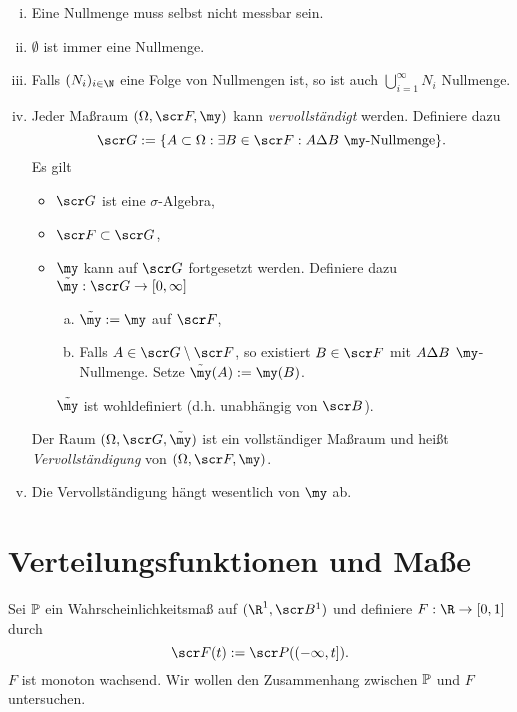 \begin{nt} \label{1.3.13}
	\begin{enumerate}[(i)] %
		\item
			Eine Nullmenge muss selbst nicht messbar sein.
		\item
			$\emptyset$ ist immer eine Nullmenge.
		\item
			Falls $(N_i)_{i \in \N}$ eine Folge von Nullmengen ist, so ist auch $\bigcup_{i=1}^\infty N_i$ Nullmenge.
		\item
			Jeder Maßraum $(\Omega, \scr F, \my)$ kann \emph{vervollständigt} werden.
			Definiere dazu
			\[
				\scr G := \{ A \subset \Omega : \exists B \in \scr F : A \symdiff B \text{ $\my$-Nullmenge} \}.
			\]
			Es gilt
			\begin{itemize}
				\item
					$\scr G$ ist eine $\sigma$-Algebra,
				\item
					$\scr F \subset \scr G$,
				\item
					$\my$ kann auf $\scr G$ fortgesetzt werden.
					Definiere dazu $\tilde \my: \scr G \to [0,\infty]$
					\begin{enumerate}[(a)]
						\item
							$\tilde \my := \my$ auf $\scr F$,
						\item
							Falls $A \in \scr G \setminus \scr F$, so existiert $B \in \scr F$ mit $A \symdiff B$ $\my$-Nullmenge.
							Setze $\tilde \my(A) := \my(B)$.
					\end{enumerate}
					$\tilde \my$ ist wohldefiniert (d.h. unabhängig von $\scr B$).
			\end{itemize}
			Der Raum $(\Omega, \scr G, \tilde \my)$ ist ein vollständiger Maßraum und heißt \emph{Vervollständigung} von $(\Omega, \scr F, \my)$.
		\item
			Die Vervollständigung hängt wesentlich von $\my$ ab.
	\end{enumerate}
\end{nt}


\section{Verteilungsfunktionen und Maße}

Sei $\P$ ein Wahrscheinlichkeitsmaß auf $(\R^1, \scr B^1)$ und definiere $F: \R \to [0,1]$ durch
\[
	\scr F(t)
	:= \scr P((-\infty, t]).
\]
$F$ ist monoton wachsend.
Wir wollen den Zusammenhang zwischen $\P$ und $F$ untersuchen.

